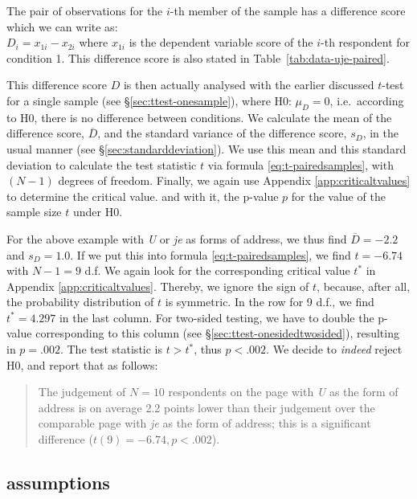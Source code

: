 \documentclass[
]{book}
\begin{document}
The pair of observations for the \(i\)-th member of the sample has a
difference score which we can write as:\\
\(D_i = x_{1i} - x_{2i}\) where \(x_{1i}\) is the dependent
variable score of the \(i\)-th respondent for condition 1. This
difference score is also stated in
Table~\ref{tab:data-uje-paired}.

This difference score \(D\) is then actually analysed with the earlier discussed \(t\)-test for a single sample (see §\ref{sec:ttest-onesample}), where H0: \(\mu_D=0\), i.e.~according to H0, there is no
difference between conditions. We calculate the mean of the difference score,
\(\overline{D}\), and the standard variance of the difference score, \(s_{D}\),
in the usual manner (see
§\ref{sec:standarddeviation}). We use this mean and this
standard deviation to calculate the test statistic \(t\) via formula
\eqref{eq:t-pairedsamples}, with \((N-1)\) degrees of freedom. Finally,
we again use
Appendix \ref{app:criticaltvalues} to determine the critical value.
and with it, the p-value \(p\) for the value of the sample size
\(t\) under H0.

For the above example with \emph{U} or \emph{je} as forms of address,
we thus find \(\overline{D}=-2.2\) and \(s_D=1.0\). If we put this into
formula \eqref{eq:t-pairedsamples}, we find \(t=-6.74\) with \(N-1=9\) d.f.
We again look for the corresponding critical value \(t^*\)
in Appendix \ref{app:criticaltvalues}. Thereby, we ignore the sign of \(t\),
because, after all, the probability distribution of \(t\) is symmetric.
In the row for 9 d.f., we find \(t^*=4.297\) in the last column.
For two-sided testing, we have to double the p-value corresponding to this
column (see
§\ref{sec:ttest-onesidedtwosided}), resulting in \(p=.002\).
The test statistic is \(t > t^*\), thus \(p<.002\). We decide to
\emph{indeed} reject H0, and report that as follows:

\begin{quote}
The judgement of \(N=10\) respondents on the page with \emph{U} as the
form of address is on average 2.2 points lower than their judgement
over the comparable page with \emph{je} as the form of address; this is
a significant difference (\(t(9)=-6.74, p<.002\)).
\end{quote}

\hypertarget{assumptions-1}{%
\subsection{assumptions}\label{assumptions-1}}
\end{document}
